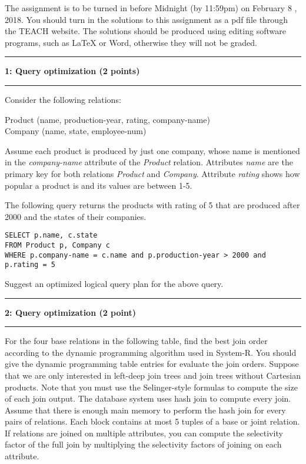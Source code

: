 \documentclass[11pt]{article}
\newcommand\question[2]{\vspace{.25in}\hrule\textbf{#1: #2}\vspace{.5em}\hrule\vspace{.10in}}
\begin{document}
\raggedright
\newcommand\NAME{Oregon State University}  %
\newcommand\ANDREWID{}     %
\newcommand\HWNUM{4}              %


The assignment is to be turned in before Midnight (by 11:59pm) on February 8 , 2018. 
You should turn in the solutions to this assignment as a pdf file through the TEACH website.
The solutions should be produced using editing software programs, such as LaTeX or Word, otherwise they will not be graded.


\question{1}{Query optimization  (2 points)}
Consider the following relations:


Product (name, production-year, rating, company-name)\\
Company (name, state, employee-num)

Assume each product is produced by just one company, whose name is mentioned in the 
{\it company-name} attribute of the {\it Product} relation. 
Attributes {\it name} are the primary key for both relations {\it Product} and {\it Company}.
Attribute {\it rating} shows how popular a product is and
its values are between 1-5. 


The following query returns the products with rating of 5 that are produced after 2000 and the states of their companies.\\

\begin{verbatim}
SELECT p.name, c.state
FROM Product p, Company c
WHERE p.company-name = c.name and p.production-year > 2000 and p.rating = 5
\end{verbatim}

Suggest an optimized logical query plan for the above query. 



\question{2}{Query optimization  (2 point)}
For the four base relations in the following table, 
find the best join order according to 
the dynamic programming algorithm used in System-R. 
You should give the dynamic programming table entries 
for evaluate the join orders.
Suppose that we are only interested in left-deep join trees and 
join trees without Cartesian products. 
Note that you must use the Selinger-style formulas to compute the size of each join output.
The database system uses hash join to compute every join.
Assume that there is enough main memory to perform the hash join for every pairs of relations.
Each block contains at most 5 tuples of a base or joint relation.
If relations are joined on multiple attributes, you can compute the selectivity factor of the full join by multiplying the 
selectivity factors of joining on each attribute.
\end{document}
